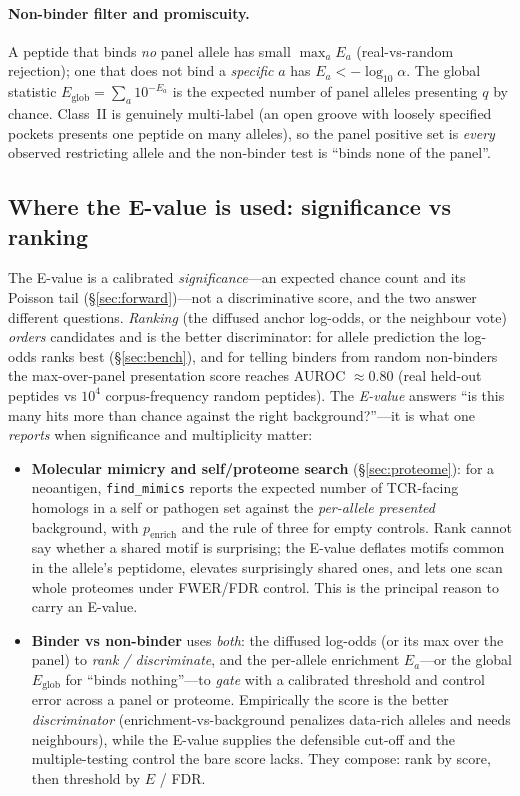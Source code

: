 \documentclass[11pt]{article}
\theoremstyle{oldplain}
\theoremstyle{oldrem}
\begin{document}
\paragraph{Non-binder filter and promiscuity.} A peptide that binds \emph{no} panel allele has small
$\max_a E_a$ (real-vs-random rejection); one that does not bind a \emph{specific} $a$ has
$E_a<-\log_{10}\alpha$. The global statistic $E_{\mathrm{glob}}=\sum_a 10^{-E_a}$ is the expected
number of panel alleles presenting $q$ by chance. Class~II is genuinely multi-label (an open groove
with loosely specified pockets presents one peptide on many alleles), so the panel positive set is
\emph{every} observed restricting allele and the non-binder test is ``binds none of the panel''.

\subsection{Where the E-value is used: significance vs ranking}\label{sec:evalue-role}
The E-value is a calibrated \emph{significance}---an expected chance count and its Poisson tail
(\S\ref{sec:forward})---not a discriminative score, and the two answer different questions.
\emph{Ranking} (the diffused anchor log-odds, or the neighbour vote) \emph{orders} candidates and is
the better discriminator: for allele prediction the log-odds ranks best (\S\ref{sec:bench}), and for
telling binders from random non-binders the max-over-panel presentation score reaches AUROC
$\approx0.80$ (real held-out peptides vs $10^4$ corpus-frequency random peptides). The \emph{E-value}
answers ``is this many hits more than chance against the right background?''---it is what one
\emph{reports} when significance and multiplicity matter:
\begin{itemize}
  \item \textbf{Molecular mimicry and self/proteome search} (\S\ref{sec:proteome}): for a neoantigen,
  \texttt{find\_mimics} reports the expected number of TCR-facing homologs in a self or pathogen set
  against the \emph{per-allele presented} background, with $p_{\mathrm{enrich}}$ and the rule of three
  for empty controls. Rank cannot say whether a shared motif is surprising; the E-value deflates
  motifs common in the allele's peptidome, elevates surprisingly shared ones, and lets one scan whole
  proteomes under FWER/FDR control. This is the principal reason to carry an E-value.
  \item \textbf{Binder vs non-binder} uses \emph{both}: the diffused log-odds (or its max over the
  panel) to \emph{rank / discriminate}, and the per-allele enrichment $E_a$---or the global
  $E_{\mathrm{glob}}$ for ``binds nothing''---to \emph{gate} with a calibrated threshold and control
  error across a panel or proteome. Empirically the score is the better \emph{discriminator}
  (enrichment-vs-background penalizes data-rich alleles and needs neighbours), while the E-value
  supplies the defensible cut-off and the multiple-testing control the bare score lacks. They
  compose: rank by score, then threshold by $E$ / FDR.
\end{itemize}
\end{document}
